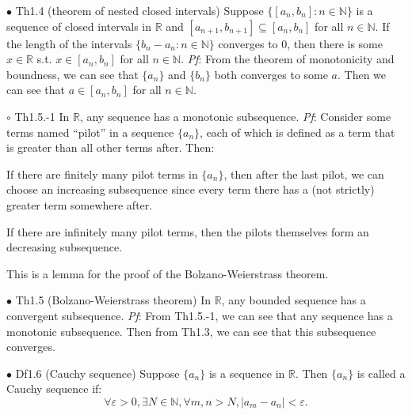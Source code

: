 \documentclass{article}
\begin{document}
\begin{Th}{$\bullet$ Th1.4 (theorem of nested closed intervals)}
    Suppose $\{[a_n, b_n]: n\in\mathbb{N}\}$ is a sequence of closed intervals in $\mathbb{R}$ and $[a_{n+1}, b_{n+1}]\subseteq [a_n, b_n]$ for all $n\in\mathbb{N}$. If the length of the intervals $\{b_n-a_n: n\in\mathbb{N}\}$ converges to $0$, then there is some $x\in\mathbb{R}$ s.t. $x\in[a_n, b_n]$ for all $n\in\mathbb{N}$.
    \tcblower
    \textit{Pf}: From the theorem of monotonicity and boundness, we can see that $\{a_n\}$ and $\{b_n\}$ both converges to some $a$. Then we can see that $a\in[a_n, b_n]$ for all $n\in\mathbb{N}$.
\end{Th}

\begin{Th}{$\circ$ Th1.5.-1}
    In $\mathbb{R}$, any sequence has a monotonic subsequence.
    \tcblower
    \textit{Pf}: Consider some terms named ``pilot'' in a sequence $\{a_n\}$, each of which is defined as a term that is greater than all other terms after. Then:
    \begin{compactitem}
        \item If there are finitely many pilot terms in $\{a_n\}$, then after the last pilot, we can choose an increasing subsequence since every term there has a (not strictly) greater term somewhere after.
        \item If there are infinitely many pilot terms, then the pilots themselves form an decreasing subsequence.
    \end{compactitem}
\end{Th}

\begin{Rmk}{}
    This is a lemma for the proof of the Bolzano-Weierstrass theorem.
\end{Rmk}

\begin{Th}{$\bullet$ Th1.5 (Bolzano-Weierstrass theorem)}
    In $\mathbb{R}$, any bounded sequence has a convergent subsequence.
    \tcblower
    \textit{Pf}: From Th1.5.-1, we can see that any sequence has a monotonic subsequence. Then from Th1.3, we can see that this subsequence converges.
\end{Th}

\begin{Df}{$\bullet$ Df1.6 (Cauchy sequence)}
    Suppose $\{a_n\}$ is a sequence in $\mathbb{R}$. Then $\{a_n\}$ is called a Cauchy sequence if:
    $$\forall \varepsilon>0, \exists N\in\mathbb{N}, \forall m, n > N, |a_m-a_n|<\varepsilon.$$
\end{Df}
\end{document}
